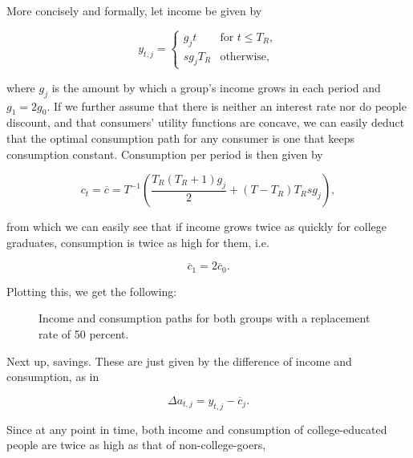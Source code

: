 \documentclass[a4paper, 12pt]{article}
\begin{document}
More concisely and formally, let income be given by

\[
    y_{t,j} = 
    \begin{cases}
        g_j t  & \text{for $t \leq T_R$},\\
        sg_j T_R  & \text{otherwise},
    \end{cases}
\]

where $g_j$ is the amount by which a group's income grows in each period and $g_1 = 2g_0$. If we further assume that there is neither an interest rate nor do people discount, and that consumers' utility functions are concave, we can easily deduct that the optimal consumption path for any consumer is one that keeps consumption constant. Consumption per period is then given by

\[
    c_t = \overline{c} = T^{-1}\left(\frac{T_R(T_R+1)g_j}{2}+(T-T_R)T_Rsg_j\right),
\]

from which we can easily see that if income grows twice as quickly for college graduates, consumption is twice as high for them, i.e.

\[
    \overline{c}_{1} = 2\overline{c}_{0}.
\]

Plotting this, we get the following:

\begin{figure}[H]
    \centering
    \caption{Income and consumption paths for both groups with a replacement rate of 50 percent.}
    \label{fig:graph3a_2}
\end{figure}

Next up, savings. These are just given by the difference of income and consumption, as in

\[
    \Delta a_{t,j} = y_{t,j} - \overline{c}_{j}.
\]

Since at any point in time, both income and consumption of college-educated people are twice as high as that of non-college-goers, 
\end{document}
